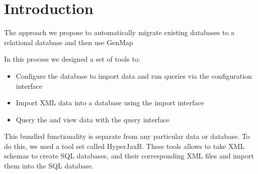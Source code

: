 \section{Introduction}
  The approach we propose to automatically migrate existing databases to a relational database and then use GenMap
  \par
 	In this process we designed a set of tools to: 
 \begin{itemize}
	\item {Configure the database to import data and run queries via the configuration interface}
	\item {Import XML data into a database using the import interface}
	\item {Query the and view data with the query interface}
\end{itemize}
	This bundled functionality is separate from any particular data or database. To do this, we used a tool set called HyperJaxB. These tools allows to take XML schemas to create SQL databases, and their corresponding XML files and import them into the SQL database. 
